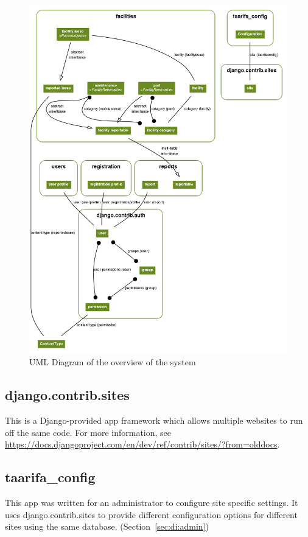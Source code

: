 \begin{figure}[h]
\centering
\includegraphics[scale=0.4]{img/overview.png}
\caption{UML Diagram of the overview of the system}
\label{fig:di:uml}
\end{figure}

\FloatBarrier

\subsection{django.contrib.sites}
This is a Django-provided app framework which allows multiple websites to run off the same code. For more information, see \url{https://docs.djangoproject.com/en/dev/ref/contrib/sites/?from=olddocs}.

\subsection{taarifa\_config}
This app was written for an administrator to configure site specific settings. It uses django.contrib.sites to provide different configuration options for different sites using the same database. (Section~\ref{sec:di:admin})

